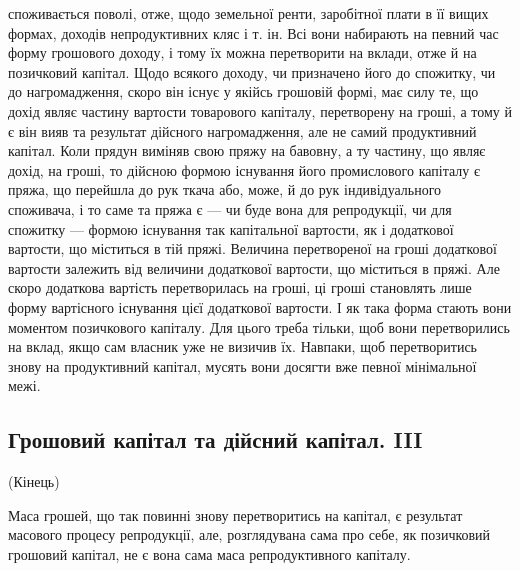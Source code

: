 \parcont{}  %
споживається поволі, отже, щодо земельної ренти, заробітної плати в її вищих
формах, доходів непродуктивних кляс і т. ін. Всі вони набирають на певний
час форму грошового доходу, і тому їх можна перетворити на вклади, отже
й на позичковий капітал. Щодо всякого доходу, чи призначено його до спожитку,
чи до нагромадження, скоро він існує у якійсь грошовій формі, має
силу те, що дохід являє частину вартости товарового капіталу, перетворену на
гроші, а тому й є він вияв та результат дійсного нагромадження, але не самий
продуктивний капітал. Коли прядун виміняв свою пряжу на бавовну, а ту частину,
що являє дохід, на гроші, то дійсною формою існування його промислового
капіталу є пряжа, що перейшла до рук ткача або, може, й до рук індивідуального
споживача, і то саме та пряжа є — чи буде вона для репродукції, чи
для спожитку — формою існування так капітальної вартости, як і додаткової
вартости, що міститься в тій пряжі. Величина перетвореної на гроші додаткової
вартости залежить від величини додаткової вартости, що міститься в пряжі.
Але скоро додаткова вартість перетворилась на гроші, ці гроші становлять лише
форму вартісного існування цієї додаткової вартости. І як така форма стають
вони моментом позичкового капіталу. Для цього треба тільки, щоб вони перетворились
на вклад, якщо сам власник уже не визичив їх. Навпаки, щоб
перетворитись знову на продуктивний капітал, мусять вони досягти вже певної
мінімальної межі.

\subsection{Грошовий капітал та дійсний капітал. III}

(Кінець)

Маса грошей, що так повинні знову перетворитись на капітал, є результат
масового процесу репродукції, але, розглядувана сама про себе, як позичковий
грошовий капітал, не є вона сама маса репродуктивного капіталу.

